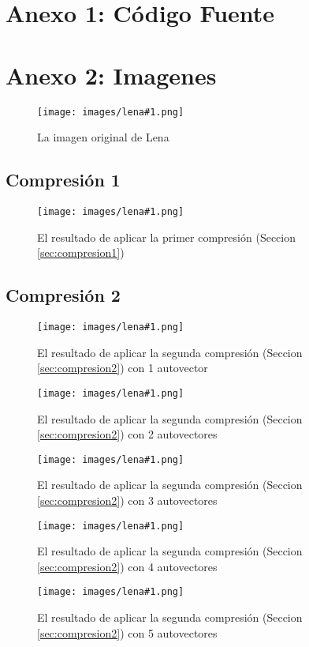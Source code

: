 \documentclass[twocolumn,a4paper,10pt]{article}
\begin{document}
\newpage
\section*{Anexo 1: Código Fuente}
    
    
    
    

\newpage
\section*{Anexo 2: Imagenes}

\newcommand{\lena}[2]{
    \begin{figure}[H]
        \texttt{[image: images/lena\#1.png]}
        \caption{#2}
        \label{fig:lena#1}
    \end{figure}
}

\newcommand{\autoimage}[2]{
    \begin{figure}[H]
        \texttt{[image: images/autoimage\#1.png]}
        \caption{#2}
        \label{fig:lena#1}
    \end{figure}
}

\lena{512}{La imagen original de Lena}

\subsection{Compresi\'on 1}

\lena{-bruta}{El resultado de aplicar la primer compresi\'on (Seccion \ref{sec:compresion1})}

\subsection{Compresi\'on 2}

\lena{-eig-1}{El resultado de aplicar la segunda compresi\'on (Seccion \ref{sec:compresion2}) con 1 autovector}
\lena{-eig-2}{El resultado de aplicar la segunda compresi\'on (Seccion \ref{sec:compresion2}) con 2 autovectores}
\lena{-eig-3}{El resultado de aplicar la segunda compresi\'on (Seccion \ref{sec:compresion2}) con 3 autovectores}
\lena{-eig-4}{El resultado de aplicar la segunda compresi\'on (Seccion \ref{sec:compresion2}) con 4 autovectores}
\lena{-eig-5}{El resultado de aplicar la segunda compresi\'on (Seccion \ref{sec:compresion2}) con 5 autovectores}
\end{document}
